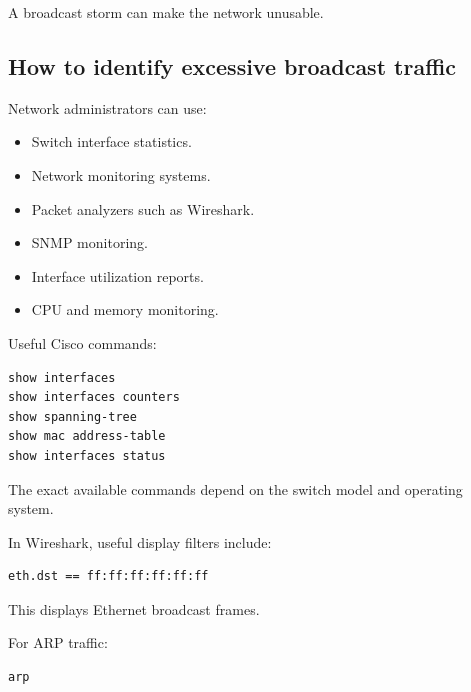 A broadcast storm can make the network unusable.

\subsection{How to identify excessive broadcast traffic}

Network administrators can use:

\begin{itemize}
\item Switch interface statistics.
\item Network monitoring systems.
\item Packet analyzers such as Wireshark.
\item SNMP monitoring.
\item Interface utilization reports.
\item CPU and memory monitoring.
\end{itemize}

Useful Cisco commands:

\begin{lstlisting}
show interfaces
show interfaces counters
show spanning-tree
show mac address-table
show interfaces status
\end{lstlisting}

The exact available commands depend on the switch model and operating system.

In Wireshark, useful display filters include:

\begin{lstlisting}
eth.dst == ff:ff:ff:ff:ff:ff
\end{lstlisting}

This displays Ethernet broadcast frames.

For ARP traffic:

\begin{lstlisting}
arp
\end{lstlisting}

